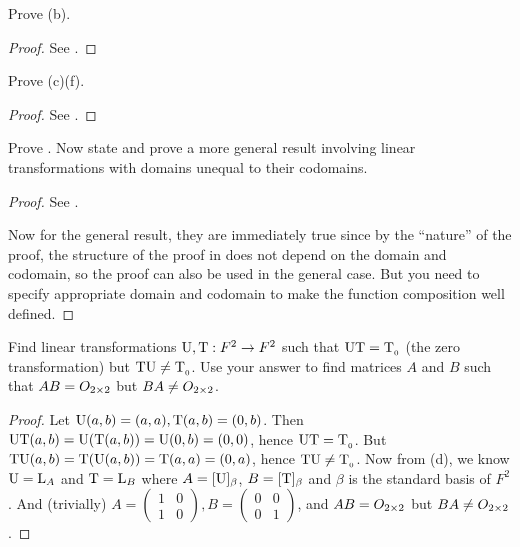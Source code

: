 \begin{exercise} \label{exercise 2.3.6}
Prove (b).
\end{exercise}

\begin{proof}
See .
\end{proof}

\begin{exercise} \label{exercise 2.3.7}
Prove (c)(f).
\end{exercise}

\begin{proof}
See .
\end{proof}

\begin{exercise} \label{exercise 2.3.8}
Prove .
Now state and prove a more general result involving linear transformations with domains unequal to their codomains.
\end{exercise}

\begin{proof}
See .

Now for the general result, they are immediately true since by the ``nature'' of the proof, the structure of the proof in  does not depend on the domain and codomain, so the proof can also be used in the general case.
But you need to specify appropriate domain and codomain to make the function composition well defined.
\end{proof}

\begin{exercise} \label{exercise 2.3.9}
Find linear transformations \(\mathrm{U}, \mathrm{T}: F^2 \to F^2\) such that \(\mathrm{U}\mathrm{T} = \mathrm{T}_{_0}\) (the zero transformation) but \(\mathrm{T}\mathrm{U} \ne \mathrm{T}_{_0}\).
Use your answer to find matrices \(A\) and \(B\) such that \(AB = O_{2 \times 2}\) but \(BA \ne O_{2 \times 2}\).
\end{exercise}

\begin{proof}
Let \(\mathrm{U}(a, b) = (a, a), \mathrm{T}(a, b) = (0, b)\).
Then \(\mathrm{U}\mathrm{T}(a, b) = \mathrm{U}(\mathrm{T}(a, b)) = \mathrm{U}(0, b) = (0, 0)\), hence \(\mathrm{U}\mathrm{T} = \mathrm{T}_{_0}\).
But \(\mathrm{T}\mathrm{U}(a, b) = \mathrm{T}(\mathrm{U}(a, b)) = \mathrm{T}(a, a) = (0, a)\), hence \(\mathrm{T}\mathrm{U} \ne \mathrm{T}_{_0}\).
Now from (d), we know \(\mathrm{U} = \mathrm{L}_A\) and \(\mathrm{T} = \mathrm{L}_B\) where \(A = [\mathrm{U}]_{\beta}\), \(B = [\mathrm{T}]_{\beta}\) and \(\beta\) is the standard basis of \(F^2\).
And (trivially) \(A = \begin{pmatrix} 1 & 0 \\ 1 & 0 \end{pmatrix}, B = \begin{pmatrix} 0 & 0 \\ 0 & 1 \end{pmatrix}\), and \(AB = O_{2 \times 2}\) but \(BA \ne O_{2 \times 2}\).
\end{proof}

